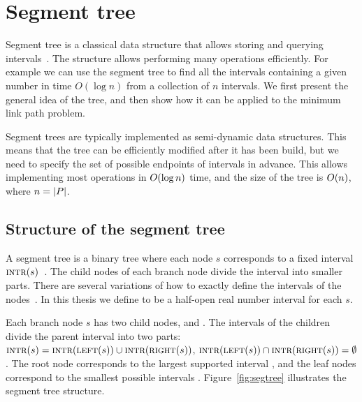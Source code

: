 \documentclass[english,gradu]{tktltiki2018}
\begin{document}
\section{Segment tree}\label{sec:segtree}

Segment tree is a classical data structure that allows storing and querying intervals~\cite{berg2008,wagner}.
The structure allows performing many operations efficiently.
For example we can use the segment tree to find all the intervals containing a given number in time $O(\log n)$ from a collection of $n$ intervals.
We first present the general idea of the tree, and then show how it can be applied to the minimum link path problem.

Segment trees are typically implemented as semi-dynamic data structures.
This means that the tree can be efficiently modified after it has been build, but we need to specify the set of possible endpoints \epts of intervals in advance.
This allows implementing most operations in $O(\log n)$ time, and the size of the tree is $O(n)$, where $n=\left |P\right |$.

\subsection{Structure of the segment tree}

A segment tree is a binary tree where each node $s$ corresponds to a fixed interval $\textsc{intr}(s)$~\cite{berg2008}.
The child nodes of each branch node divide the interval into smaller parts.
There are several variations of how to exactly define the intervals of the nodes~\cite{berg2008,kkkk}.
In this thesis we define  to be a half-open real number interval for each $s$.

Each branch node $s$ has two child nodes,  and .
The intervals of the children divide the parent interval into two parts:
$\textsc{intr}(s)=\textsc{intr}(\textsc{left}(s))\cup\textsc{intr}(\textsc{right}(s))$, $\textsc{intr}(\textsc{left}(s))\cap\textsc{intr}(\textsc{right}(s))=\emptyset$.
The root node corresponds to the largest supported interval \range{\epts[1]}{\epts[\segsize]}, and the leaf nodes correspond to the smallest possible intervals \range{\epts[i]}{\epts[i+1]}.
Figure~\ref{fig:segtree} illustrates the segment tree structure.
\end{document}
